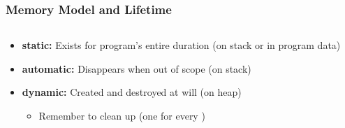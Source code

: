 \documentclass[glossy]{beamer}
\newcommand{\refer}[1]{([shift={(.25em,.25em)}]pic cs:#1)}
\begin{document}
\begin{frame}[fragile=singleslide]
  \frametitle{Memory Model and Lifetime}
  \begin{columns}
    \begin{column}{6cm}
      \begin{itemize}
        \item \textbf{static:} Exists for program's entire duration (on stack or in program data)
        \item \textbf{automatic:} Disappears when out of scope (on stack)
        \item \textbf{dynamic:} Created and destroyed at will (on heap)
        \begin{itemize}
          \item Remember to clean up (one  for every )
        \end{itemize}
      \end{itemize}
    \end{column}

    \begin{column}{6cm}
    \end{column}
  \end{columns}

\end{frame}

\end{document}
